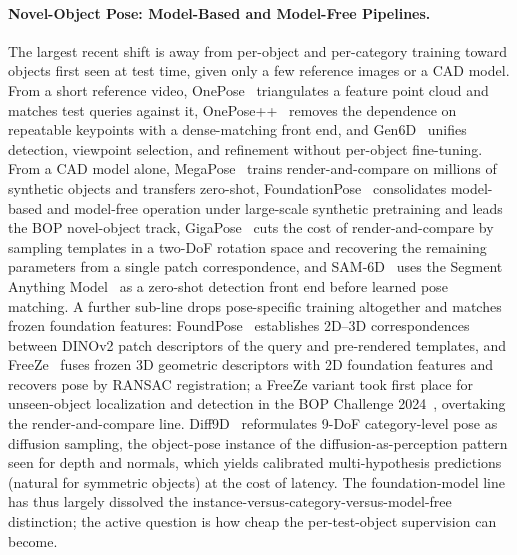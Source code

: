 \paragraph{Novel-Object Pose: Model-Based and Model-Free Pipelines.}
The largest recent shift is away from per-object and per-category training toward objects first seen at test time, given only a few reference images or a CAD model.
From a short reference video, OnePose~\cite{sun2022onepose} triangulates a feature point cloud and matches test queries against it, OnePose++~\cite{he2022oneposepp} removes the dependence on repeatable keypoints with a dense-matching front end, and Gen6D~\cite{liu2022gen6d} unifies detection, viewpoint selection, and refinement without per-object fine-tuning.
From a CAD model alone, MegaPose~\cite{labbe2022megapose} trains render-and-compare on millions of synthetic objects and transfers zero-shot, FoundationPose~\cite{wen2024foundationpose} consolidates model-based and model-free operation under large-scale synthetic pretraining and leads the BOP novel-object track, GigaPose~\cite{nguyen2024gigapose} cuts the cost of render-and-compare by sampling templates in a two-DoF rotation space and recovering the remaining parameters from a single patch correspondence, and SAM-6D~\cite{lin2024sam6d} uses the Segment Anything Model~\cite{kirillov2023sam} as a zero-shot detection front end before learned pose matching.
A further sub-line drops pose-specific training altogether and matches frozen foundation features: FoundPose~\cite{ornek2024foundpose} establishes 2D--3D correspondences between DINOv2 patch descriptors of the query and pre-rendered templates, and FreeZe~\cite{caraffa2024freeze} fuses frozen 3D geometric descriptors with 2D foundation features and recovers pose by RANSAC registration; a FreeZe variant took first place for unseen-object localization and detection in the BOP Challenge 2024~\cite{nguyen2024bopchallenge}, overtaking the render-and-compare line.
Diff9D~\cite{liu2024diff9d} reformulates 9-DoF category-level pose as diffusion sampling, the object-pose instance of the diffusion-as-perception pattern seen for depth and normals, which yields calibrated multi-hypothesis predictions (natural for symmetric objects) at the cost of latency.
The foundation-model line has thus largely dissolved the instance-versus-category-versus-model-free distinction; the active question is how cheap the per-test-object supervision can become.

